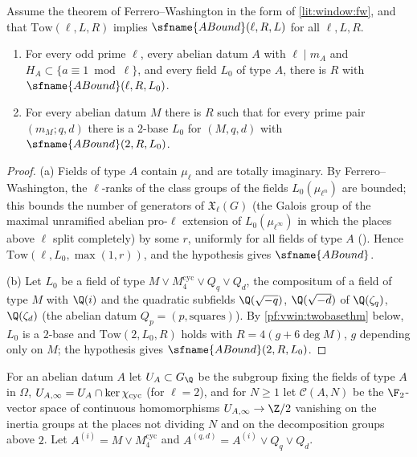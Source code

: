 \begin{proposition}\label{pf:vwin:fixedtwo}
Assume the theorem of Ferrero--Washington in the form of \cref{lit:window:fw}, and that $\mathrm{Tow}(\ell,L,R)$ implies
$\sfname{ABound}(\ell,R,L)$ for all $\ell,L,R$.
\begin{enumerate}[label=(\alph*)]
\item For every odd prime $\ell$, every abelian datum $A$ with $\ell\mid m_A$ and $H_A\subset\{a\equiv1\bmod\ell\}$, and every field
$L_0$ of type $A$, there is $R$ with $\sfname{ABound}(\ell,R,L_0)$.
\item For every abelian datum $M$ there is $R$ such that for every prime pair $(m_M;q,d)$ there is a $2$-base $L_0$ for $(M,q,d)$
with $\sfname{ABound}(2,R,L_0)$.
\end{enumerate}
\end{proposition}

\begin{proof}
(a) Fields of type $A$ contain $\mu_\ell$ and are totally imaginary. By Ferrero--Washington, the $\ell$-ranks of the class groups of
the fields $L_0(\mu_{\ell^n})$ are bounded; this bounds the number of generators of $\mathfrak X_\ell(G)$ (the Galois group of the
maximal unramified abelian pro-$\ell$ extension of $L_0(\mu_{\ell^\infty})$ in which the places above $\ell$ split completely) by some
$r$, uniformly for all fields of type $A$ (). Hence $\mathrm{Tow}(\ell,L_0,\max(1,r))$, and the
hypothesis gives $\sfname{ABound}$.

(b) Let $L_0$ be a field of type $M\vee M^{\mathrm{cyc}}_4\vee Q_q\vee Q_d$, the compositum of a field of type $M$ with $\Q(i)$ and
the quadratic subfields $\Q(\sqrt{-q})$, $\Q(\sqrt{-d})$ of $\Q(\zeta_q)$, $\Q(\zeta_d)$ (the abelian datum $Q_p=(p,\text{squares})$). By
\cref{pf:vwin:twobasethm} below, $L_0$ is a $2$-base and $\mathrm{Tow}(2,L_0,R)$ holds with $R=4(g+6\deg M)$, $g$ depending only on $M$; the
hypothesis gives $\sfname{ABound}(2,R,L_0)$.
\end{proof}

For an abelian datum $A$ let $U_A\subset G_\Q$ be the subgroup fixing the fields of type $A$ in $\Omega$, $U_{A,\infty}=U_A\cap\ker\chi_{\mathrm{cyc}}$
(for $\ell=2$), and for $N\ge1$ let $\mathcal C(A,N)$ be the $\F_2$-vector space of continuous homomorphisms $U_{A,\infty}\to\Z/2$ vanishing
on the inertia groups at the places not dividing $N$ and on the decomposition groups above $2$. Let $A^{(i)}=M\vee M^{\mathrm{cyc}}_4$ and
$A^{(q,d)}=A^{(i)}\vee Q_q\vee Q_d$.

